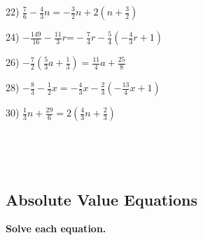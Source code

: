 \documentclass[11pt]{book}
\newcommand{\tmstrong}[1]{\textbf{#1}}
\theoremstyle{definition}  %
\begin{document}
\begin{multicols}{2}
  22) $\frac{7}{6} - \frac{4}{3} n = - \frac{3}{2} n + 2 (n + \frac{3}{2})$
  
  24) $- \frac{149}{16} - \frac{11}{3} r \text{=} - \frac{7}{4} r -
  \frac{5}{4} (- \frac{4}{3} r + 1)$
  
  26) $- \frac{7}{2} (\frac{5}{3} a + \frac{1}{3}) = \frac{11}{4} a +
  \frac{25}{8}$
  
  28) $- \frac{8}{3} - \frac{1}{2} x = - \frac{4}{3} x - \frac{2}{3} (-
  \frac{13}{4} x + 1)$
  
  30) $\frac{1}{3} n + \frac{29}{6} = 2 (\frac{4}{3} n + \frac{2}{3})$
  
  \ 
\end{multicols}

\vspace{3in}
~

\pagebreak

\subsection{Absolute Value Equations}\par

{\tmstrong{Solve each equation.}}
\end{document}
